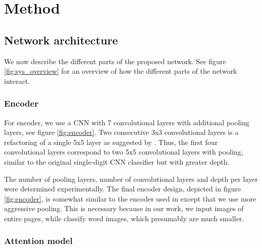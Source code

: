 \section{Method}

\subsection{Network architecture}



We now describe the different parts of the proposed network. See figure \ref{fig:sys_overview} for an overview of how the different parts of the network interact.

\subsubsection{Encoder}



For encoder, we use a CNN with 7 convolutional layers with additional pooling layers, see figure \ref{fig:encoder}.
Two consecutive 3x3 convolutional layers is a refactoring of a single 5x5 layer as suggested by \textcite{InceptionV3}. Thus, the first four convolutional layers correspond to two 5x5 convolutional layers with pooling, similar to the original single-digit CNN classifier \cite{lecun_1989} but with greater depth.

The number of pooling layers, number of convolutional layers and depth per layer were determined experimentally. The final encoder design, depicted in figure \ref{fig:encoder}, is somewhat similar to the encoder used in \cite{FornesCnnCategorization} except that we use more aggressive pooling. This is necessary because in our work, we input images of entire pages, while \textcite{FornesCnnCategorization} classify word images, which presumably are much smaller.





\subsubsection{Attention model}

